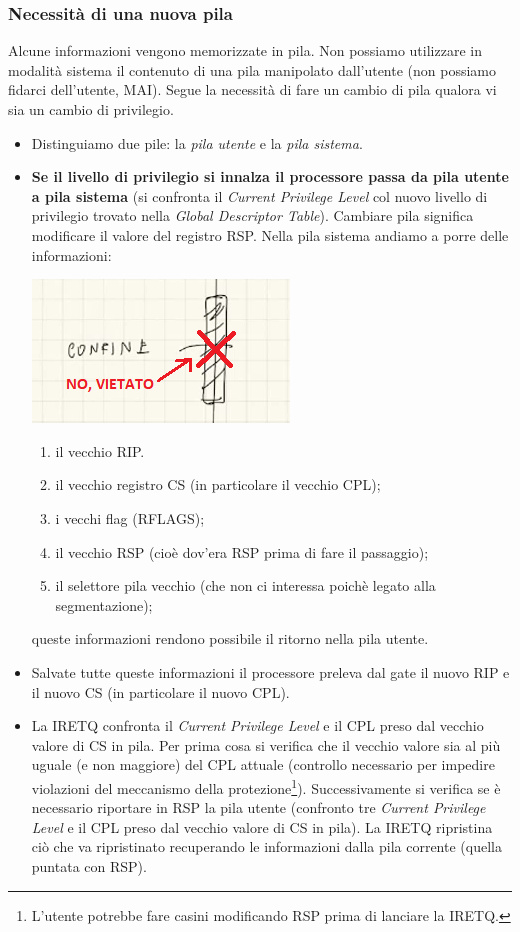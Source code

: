 \documentclass[11pt]{report}
\theoremstyle{definition}
\begin{document}
\subsubsection{Necessità di una nuova pila}
Alcune informazioni vengono memorizzate in pila. Non possiamo utilizzare in modalità sistema il contenuto di una pila manipolato dall'utente (non possiamo fidarci dell'utente, MAI). Segue la necessità di fare un cambio di pila qualora vi sia un cambio di privilegio.\begin{itemize}
	\item Distinguiamo due pile: la \emph{pila utente} e la \emph{pila sistema}.
	\item \textbf{Se il livello di privilegio si innalza il processore passa da pila utente a pila sistema} (si confronta il \emph{Current Privilege Level} col nuovo livello di privilegio trovato nella \emph{Global Descriptor Table}). Cambiare pila significa modificare il valore del registro RSP. Nella pila sistema andiamo a porre delle informazioni: 
	\begin{center}
		\includegraphics[scale=.8]{img/283.PNG}
	\end{center}
	\begin{enumerate}
		\item il vecchio RIP.
		\item il vecchio registro CS (in particolare il vecchio CPL);
		\item i vecchi flag (RFLAGS);
		\item il vecchio RSP (cioè dov'era RSP prima di fare il passaggio);
		\item il selettore pila vecchio (che non ci interessa poichè legato alla segmentazione);
	\end{enumerate}
	queste informazioni rendono possibile il ritorno nella pila utente.
	\item Salvate tutte queste informazioni il processore preleva dal gate il nuovo RIP e il nuovo CS (in particolare il nuovo CPL). 
	\item La IRETQ confronta il \emph{Current Privilege Level} e il CPL preso dal vecchio valore di CS in pila. Per prima cosa si verifica che il vecchio valore sia al più uguale (e non maggiore) del CPL attuale (controllo necessario per impedire violazioni del meccanismo della protezione\footnote{L'utente potrebbe fare casini modificando RSP prima di lanciare la IRETQ.}). Successivamente si verifica se è necessario riportare in RSP la pila utente (confronto tre \emph{Current Privilege Level} e il CPL preso dal vecchio valore di CS in pila). La IRETQ ripristina ciò che va ripristinato recuperando le informazioni dalla pila corrente (quella puntata con RSP). 
\end{itemize}
\end{document}
